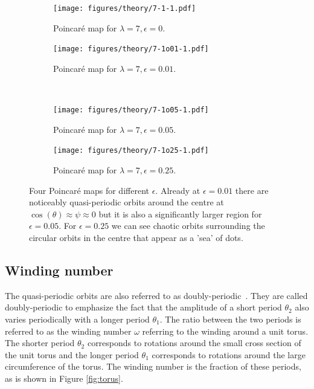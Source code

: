 \begin{figure}[H]
\centering
\begin{subfigure}[3a]{0.40\textwidth}
\texttt{[image: figures/theory/7-1-1.pdf]}
\caption{Poincaré map for $\lambda = 7, \epsilon = 0$.}\label{fig:orbitmap1}
\end{subfigure}\hspace{1em}%
\begin{subfigure}[3b]{0.40\textwidth}
\texttt{[image: figures/theory/7-1o01-1.pdf]}
\caption{Poincaré map for $\lambda = 7, \epsilon = 0.01$.}\label{fig:orbitmap2}
\end{subfigure} \\
\begin{subfigure}[3a]{0.40\textwidth}
\texttt{[image: figures/theory/7-1o05-1.pdf]}
\caption{Poincaré map for $\lambda = 7, \epsilon = 0.05$.}\label{fig:orbitmap3}
\end{subfigure}\hspace{1em}%
	\begin{subfigure}[3b]{0.40\textwidth}
\texttt{[image: figures/theory/7-1o25-1.pdf]}
\caption{Poincaré map for $\lambda = 7, \epsilon = 0.25$.}\label{fig:orbitmap4}
\end{subfigure} 
\caption{Four Poincaré maps for different $\epsilon$. Already at $\epsilon = 0.01$ there are noticeably quasi-periodic 
orbits around the centre at $\cos(\theta) \approx \psi \approx 0$ but it is also a significantly larger region for $\epsilon = 0.05$. For $\epsilon = 0.25$ we can see chaotic orbits surrounding the circular orbits in the centre that appear as a 'sea' of dots.} %
\end{figure}

\subsection{Winding number} \label{sec:winding}
The quasi-periodic orbits are also referred to as doubly-periodic~\cite{Yarin}. They are called doubly-periodic to emphasize the fact that the amplitude of a short period $\theta_2$ also varies periodically with a longer period $\theta_1$. The ratio between the two periods is referred to as the winding number $\omega$ referring to the winding around a unit torus. The shorter period $\theta_2$ corresponds to rotations around the small cross section of the unit torus and the longer period $\theta_1$ corresponds to rotations around the large circumference of the torus. The winding number is the fraction of these periods, as is shown in Figure \ref{fig:torus}. 

